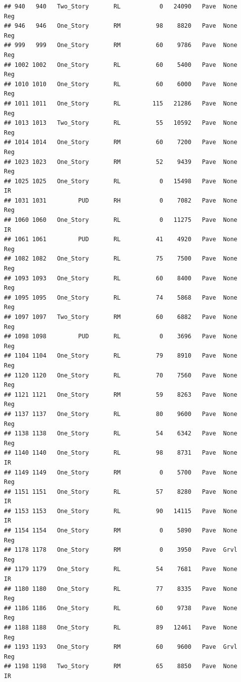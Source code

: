 \documentclass[]{article}
\begin{document}
\begin{verbatim}
## 940   940   Two_Story       RL           0   24090   Pave  None      Reg
## 946   946   One_Story       RM          98    8820   Pave  None      Reg
## 999   999   One_Story       RM          60    9786   Pave  None      Reg
## 1002 1002   One_Story       RL          60    5400   Pave  None      Reg
## 1010 1010   One_Story       RL          60    6000   Pave  None      Reg
## 1011 1011   One_Story       RL         115   21286   Pave  None      Reg
## 1013 1013   Two_Story       RL          55   10592   Pave  None      Reg
## 1014 1014   One_Story       RM          60    7200   Pave  None      Reg
## 1023 1023   One_Story       RM          52    9439   Pave  None      Reg
## 1025 1025   One_Story       RL           0   15498   Pave  None       IR
## 1031 1031         PUD       RH           0    7082   Pave  None      Reg
## 1060 1060   One_Story       RL           0   11275   Pave  None       IR
## 1061 1061         PUD       RL          41    4920   Pave  None      Reg
## 1082 1082   One_Story       RL          75    7500   Pave  None      Reg
## 1093 1093   One_Story       RL          60    8400   Pave  None      Reg
## 1095 1095   One_Story       RL          74    5868   Pave  None      Reg
## 1097 1097   Two_Story       RM          60    6882   Pave  None      Reg
## 1098 1098         PUD       RL           0    3696   Pave  None      Reg
## 1104 1104   One_Story       RL          79    8910   Pave  None      Reg
## 1120 1120   One_Story       RL          70    7560   Pave  None      Reg
## 1121 1121   One_Story       RM          59    8263   Pave  None      Reg
## 1137 1137   One_Story       RL          80    9600   Pave  None      Reg
## 1138 1138   One_Story       RL          54    6342   Pave  None      Reg
## 1140 1140   One_Story       RL          98    8731   Pave  None       IR
## 1149 1149   One_Story       RM           0    5700   Pave  None      Reg
## 1151 1151   One_Story       RL          57    8280   Pave  None       IR
## 1153 1153   One_Story       RL          90   14115   Pave  None       IR
## 1154 1154   One_Story       RM           0    5890   Pave  None      Reg
## 1178 1178   One_Story       RM           0    3950   Pave  Grvl      Reg
## 1179 1179   One_Story       RL          54    7681   Pave  None       IR
## 1180 1180   One_Story       RL          77    8335   Pave  None      Reg
## 1186 1186   One_Story       RL          60    9738   Pave  None      Reg
## 1188 1188   One_Story       RL          89   12461   Pave  None      Reg
## 1193 1193   One_Story       RM          60    9600   Pave  Grvl      Reg
## 1198 1198   Two_Story       RM          65    8850   Pave  None       IR

\end{verbatim}
\end{document}
